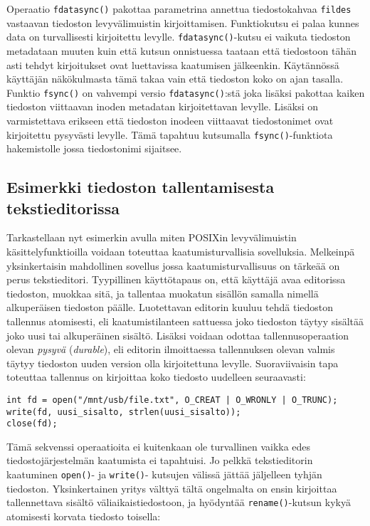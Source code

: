 Operaatio \texttt{fdatasync()} pakottaa parametrina annettua tiedostokahvaa \texttt{fildes} vastaavan tiedoston levyvälimuistin kirjoittamisen.
Funktiokutsu ei palaa kunnes data on turvallisesti kirjoitettu levylle.
\texttt{fdatasync()}-kutsu ei vaikuta tiedoston metadataan muuten kuin että kutsun onnistuessa taataan että tiedostoon tähän asti tehdyt kirjoitukset ovat luettavissa kaatumisen jälkeenkin.
Käytännössä käyttäjän näkökulmasta tämä takaa vain että tiedoston koko on ajan tasalla.
Funktio \texttt{fsync()} on vahvempi versio \texttt{fdatasync()}:stä joka lisäksi pakottaa kaiken tiedoston viittaavan inoden metadatan kirjoitettavan levylle.
Lisäksi on varmistettava erikseen että tiedoston inodeen viittaavat tiedostonimet ovat kirjoitettu pysyvästi levylle.
Tämä tapahtuu kutsumalla \texttt{fsync()}-funktiota hakemistolle jossa tiedostonimi sijaitsee.

\subsection{Esimerkki tiedoston tallentamisesta tekstieditorissa}
Tarkastellaan nyt esimerkin avulla miten POSIXin levyvälimuistin käsittelyfunktioilla voidaan toteuttaa kaatumisturvallisia sovelluksia.
Melkeinpä yksinkertaisin mahdollinen sovellus jossa kaatumisturvallisuus on tärkeää on perus tekstieditori.
Tyypillinen käyttötapaus on, että käyttäjä avaa editorissa tiedoston, muokkaa sitä, ja tallentaa muokatun sisällön samalla nimellä alkuperäisen tiedoston päälle.
Luotettavan editorin kuuluu tehdä tiedoston tallennus atomisesti,
eli kaatumistilanteen sattuessa joko tiedoston täytyy sisältää joko uusi tai alkuperäinen sisältö.
Lisäksi voidaan odottaa tallennusoperaation olevan \emph{pysyvä} (\emph{durable}),
eli editorin ilmoittaessa tallennuksen olevan valmis täytyy tiedoston uuden version olla kirjoitettuna levylle.
Suoraviivaisin tapa toteuttaa tallennus on kirjoittaa koko tiedosto uudelleen seuraavasti:

\begin{verbatim}
int fd = open("/mnt/usb/file.txt", O_CREAT | O_WRONLY | O_TRUNC);
write(fd, uusi_sisalto, strlen(uusi_sisalto));
close(fd);
\end{verbatim}

Tämä sekvenssi operaatioita ei kuitenkaan ole turvallinen vaikka edes tiedostojärjestelmän kaatumista ei tapahtuisi.
Jo pelkkä tekstieditorin kaatuminen \texttt{open()}- ja \texttt{write()}- kutsujen välissä jättää jäljelleen tyhjän tiedoston.
Yksinkertainen yritys välttyä tältä ongelmalta on ensin kirjoittaa tallennettava sisältö väliaikaistiedostoon,
ja hyödyntää \texttt{rename()}-kutsun kykyä atomisesti korvata tiedosto toisella:

